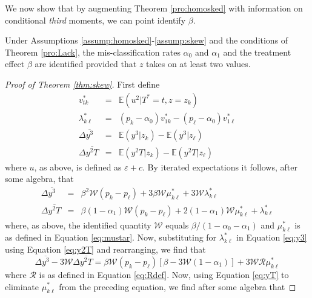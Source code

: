 We now show that by augmenting Theorem \ref{pro:homosked} with information on conditional \emph{third} moments, we can point identify $\beta$.

\begin{thm}
  \label{thm:skew}
  Under Assumptions \ref{assump:homosked}-\ref{assump:skew} and the conditions of Theorem \ref{pro:Lack}, the mis-classification rates $\alpha_0$ and $\alpha_1$ and the treatment effect $\beta$ are identified provided that $z$ takes on at least two values.
\end{thm}

\begin{proof}[Proof of Theorem \ref{thm:skew}]
  First define 
  \begin{eqnarray}
    \label{eq:vstar}
  v^*_{tk} &=&  \mathbb{E}(u^2|T^*=t, z = z_k)\\
    \label{eq:lambda}
  \lambda_{k\ell}^* &=& (p_k - \alpha_0) v_{1k}^* - (p_\ell - \alpha_0) v_{1\ell}^*\\
    \label{eq:y3def}
    \Delta\overline{y^3} &=&  \mathbb{E}(y^3|z_k) - \mathbb{E}(y^3|z_\ell)\\
    \label{eq:y2Tdef}
    \Delta\overline{y^2T} &=&  \mathbb{E}(y^2T|z_k) - \mathbb{E}(y^2T|z_\ell)
  \end{eqnarray}
  where $u$, as above, is defined as $\varepsilon + c$.
  By iterated expectations it follows, after some algebra, that
  \begin{eqnarray}
    \label{eq:y3}
    \Delta\overline{y^3} &=& \beta^2 \mathcal{W} (p_k - p_\ell)  + 3 \beta \mathcal{W} \mu_{k\ell}^* + 3 \mathcal{W} \lambda^*_{k\ell}\\
    \label{eq:y2T}
    \Delta\overline{y^2T} &=& \beta(1-\alpha_1)\mathcal{W}(p_k - p_\ell) + 2(1-\alpha_1)\mathcal{W}\mu_{k\ell}^* + \lambda_{k\ell}^* 
  \end{eqnarray}
  where, as above, the identified quantity $\mathcal{W}$ equals $\beta/(1 - \alpha_0 - \alpha_1)$ and $\mu_{k\ell}^*$ is as defined in Equation \ref{eq:mustar}.
  Now, substituting for $\lambda^*_{k\ell}$ in Equation \ref{eq:y3} using Equation \ref{eq:y2T} and rearranging, we find that
  \begin{equation}
    \Delta \overline{y^3} - 3 \mathcal{W} \Delta\overline{y^2T} = \beta \mathcal{W} (p_k - p_\ell)\left[ \beta - 3 \mathcal{W} (1-\alpha_1) \right]+ 3\mathcal{W}\mathcal{R}\mu^*_{k\ell}
    \label{eq:diffy3}
  \end{equation}
  where $\mathcal{R}$ is as defined in Equation \ref{eq:Rdef}.
  Now, using Equation \ref{eq:yT} to eliminate $\mu_{k\ell}^*$ from the preceding equation, we find after some algebra that 

\end{proof}
